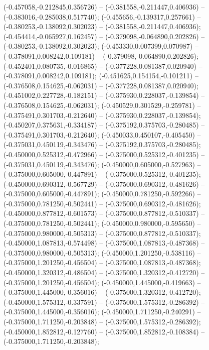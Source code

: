  (-0.457058,-0.212845,0.356726) -- (-0.381558,-0.211447,0.406936) -- (-0.383016,-0.285038,0.517740);
 (-0.455656,-0.139317,0.257661) -- (-0.380253,-0.138092,0.302023) -- (-0.381558,-0.211447,0.406936);
 (-0.454414,-0.065927,0.162457) -- (-0.379098,-0.064890,0.202826) -- (-0.380253,-0.138092,0.302023);
 (-0.453330,0.007399,0.070987) -- (-0.378091,0.008242,0.109181) -- (-0.379098,-0.064890,0.202826);
 (-0.452401,0.080735,-0.016865) -- (-0.377228,0.081387,0.020940) -- (-0.378091,0.008242,0.109181);
 (-0.451625,0.154154,-0.101211) -- (-0.376508,0.154625,-0.062031) -- (-0.377228,0.081387,0.020940);
 (-0.451002,0.227728,-0.182151) -- (-0.375930,0.228037,-0.139854) -- (-0.376508,0.154625,-0.062031);
 (-0.450529,0.301529,-0.259781) -- (-0.375491,0.301703,-0.212640) -- (-0.375930,0.228037,-0.139854);
 (-0.450207,0.375631,-0.334187) -- (-0.375192,0.375703,-0.280485) -- (-0.375491,0.301703,-0.212640);
 (-0.450033,0.450107,-0.405450) -- (-0.375031,0.450119,-0.343476) -- (-0.375192,0.375703,-0.280485);
 (-0.450000,0.525312,-0.472966) -- (-0.375000,0.525312,-0.401235) -- (-0.375031,0.450119,-0.343476);
 (-0.450000,0.605000,-0.527963) -- (-0.375000,0.605000,-0.447891) -- (-0.375000,0.525312,-0.401235);
 (-0.450000,0.690312,-0.567729) -- (-0.375000,0.690312,-0.481626) -- (-0.375000,0.605000,-0.447891);
 (-0.450000,0.781250,-0.592266) -- (-0.375000,0.781250,-0.502441) -- (-0.375000,0.690312,-0.481626);
 (-0.450000,0.877812,-0.601573) -- (-0.375000,0.877812,-0.510337) -- (-0.375000,0.781250,-0.502441);
 (-0.450000,0.980000,-0.595650) -- (-0.375000,0.980000,-0.505313) -- (-0.375000,0.877812,-0.510337);
 (-0.450000,1.087813,-0.574498) -- (-0.375000,1.087813,-0.487368) -- (-0.375000,0.980000,-0.505313);
 (-0.450000,1.201250,-0.538116) -- (-0.375000,1.201250,-0.456504) -- (-0.375000,1.087813,-0.487368);
 (-0.450000,1.320312,-0.486504) -- (-0.375000,1.320312,-0.412720) -- (-0.375000,1.201250,-0.456504);
 (-0.450000,1.445000,-0.419663) -- (-0.375000,1.445000,-0.356016) -- (-0.375000,1.320312,-0.412720);
 (-0.450000,1.575312,-0.337591) -- (-0.375000,1.575312,-0.286392) -- (-0.375000,1.445000,-0.356016);
 (-0.450000,1.711250,-0.240291) -- (-0.375000,1.711250,-0.203848) -- (-0.375000,1.575312,-0.286392);
 (-0.450000,1.852812,-0.127760) -- (-0.375000,1.852812,-0.108384) -- (-0.375000,1.711250,-0.203848);
